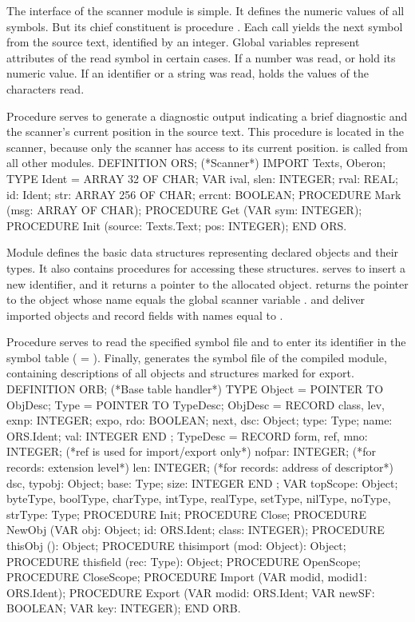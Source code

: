 The interface of the scanner module  is simple. It defines the numeric values of all symbols. But its chief constituent is procedure . Each call yields the next symbol from the source text, identified by an integer. Global variables represent attributes of the read symbol in certain cases. If a number was read,  or  hold its numeric value. If an identifier or a string was read,  holds the \ASCII values of the characters read.

Procedure  serves to generate a diagnostic output indicating a brief diagnostic and the scanner's current position in the source text. This procedure is located in the scanner, because only the scanner has access to its current position.  is called from all other modules.
\begintt
DEFINITION ORS; (*Scanner*)
  IMPORT Texts, Oberon;
  TYPE Ident = ARRAY 32 OF CHAR;
  VAR ival, slen: INTEGER;
      rval: REAL;
      id: Ident;
      str: ARRAY 256 OF CHAR;
      errcnt: BOOLEAN;
  PROCEDURE Mark (msg: ARRAY OF CHAR);
  PROCEDURE Get (VAR sym: INTEGER);
  PROCEDURE Init (source: Texts.Text; pos: INTEGER);
END ORS.
\endtt

\noindent Module  defines the basic data structures representing declared objects and their types. It also contains procedures for accessing these structures.  serves to insert a new identifier, and it returns a pointer to the allocated object.  returns the pointer to the object whose name equals the global scanner variable .  and  deliver imported objects and record fields with names equal to .

Procedure  serves to read the specified symbol file and to enter its identifier in the symbol table ( = ). Finally,  generates the symbol file of the compiled module, containing descriptions of all objects and structures marked for export.
\begintt
DEFINITION ORB; (*Base table handler*)
  TYPE
    Object = POINTER TO ObjDesc;
    Type = POINTER TO TypeDesc;
    ObjDesc = RECORD
      class, lev, exnp: INTEGER;
      expo, rdo: BOOLEAN;
      next, dsc: Object;
      type: Type;
      name: ORS.Ident;
      val: INTEGER
    END ;
    TypeDesc = RECORD
      form, ref, mno: INTEGER; (*ref is used for import/export only*)
      nofpar: INTEGER; (*for records: extension level*)
      len: INTEGER; (*for records: address of descriptor*)
      dsc, typobj: Object;
      base: Type;
      size: INTEGER
    END ;
  VAR topScope: Object;
    byteType, boolType, charType, intType, realType, setType,
    nilType, noType, strType: Type;
  PROCEDURE Init;
  PROCEDURE Close;
  PROCEDURE NewObj (VAR obj: Object; id: ORS.Ident; class: INTEGER);
  PROCEDURE thisObj (): Object;
  PROCEDURE thisimport (mod: Object): Object;
  PROCEDURE thisfield (rec: Type): Object;
  PROCEDURE OpenScope;
  PROCEDURE CloseScope;
  PROCEDURE Import (VAR modid, modid1: ORS.Ident);
  PROCEDURE Export (VAR modid: ORS.Ident;
                    VAR newSF: BOOLEAN; VAR key: INTEGER);
END ORB.
\endtt

